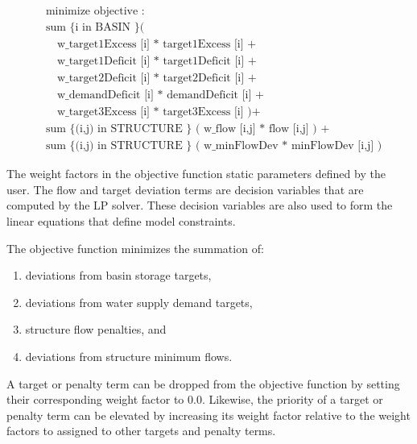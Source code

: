 \begin{equation}
 \begin{split}
  & \textrm { minimize objective } : \\
  & \textrm { sum \{ i in BASIN \} (}   \\
  & \quad \textrm { w\_target1Excess [i] * target1Excess [i] } + \\
  & \quad \textrm { w\_target1Deficit [i] * target1Deficit [i] } +  \\
  & \quad \textrm { w\_target2Deficit [i] * target2Deficit [i] } + \\
  & \quad \textrm { w\_demandDeficit [i]  * demandDeficit [i] } + \\
  & \quad \textrm { w\_target3Excess [i]  * target3Excess [i] )} + \\
  & \textrm { sum  \{ (i,j) in STRUCTURE \} } \textrm { ( w\_flow [i,j] * flow [i,j] ) }+ \\
  & \textrm { sum  \{ (i,j) in STRUCTURE \} } \textrm { ( w\_minFlowDev * minFlowDev [i,j] ) }
 \end{split}
\end{equation}

The weight factors in the objective function static parameters defined
by the user.  The flow and target deviation terms are decision
variables that are computed by the LP solver.  These decision
variables are also used to form the linear equations that define model
constraints.

The objective function minimizes the summation of:

\begin{enumerate}
 
 \item deviations from basin storage targets, 

 \item deviations from water supply demand targets, 

 \item structure flow penalties, and

 \item deviations from structure minimum flows.

\end{enumerate}

A target or penalty term can be dropped from the objective function by
setting their corresponding weight factor to 0.0.  Likewise, the
priority of a target or penalty term can be elevated by increasing its
weight factor relative to the weight factors to assigned to other
targets and penalty terms.

